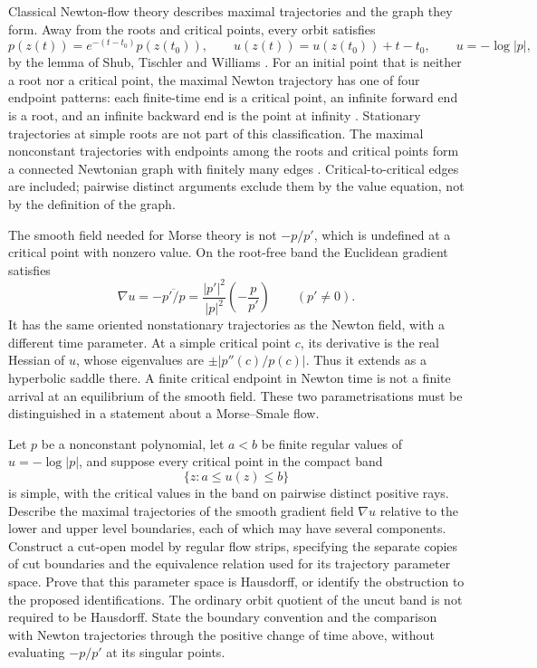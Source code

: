 \documentclass[11pt]{article}
\begin{document}
Classical Newton-flow theory describes maximal trajectories and the graph
they form. Away from the roots and critical points, every orbit satisfies
\[
 p(z(t))=e^{-(t-t_0)}p(z(t_0)),\qquad
 u(z(t))=u(z(t_0))+t-t_0,\qquad u=-\log|p|,
\]
by the lemma of Shub, Tischler and Williams
\cite[Lemma~2.1]{kozen-stefansson1997}. For an initial point that is neither
a root nor a critical point, the maximal Newton trajectory has one of
four endpoint patterns: each finite-time end is a critical point, an
infinite forward end is a root, and an infinite backward end is the
point at infinity \cite[Lemma~2.2]{kozen-stefansson1997}. Stationary
trajectories at simple roots are not part of this classification. The
maximal nonconstant trajectories with endpoints among the roots and critical
points form a connected Newtonian graph with finitely many edges
\cite[Definition~2.1 and \S2]{kozen-stefansson1997}. Critical-to-critical
edges are included; pairwise distinct arguments exclude them by the value
equation, not by the definition of the graph.

The smooth field needed for Morse theory is not $-p/p'$, which is
undefined at a critical point with nonzero value. On the root-free band the
Euclidean gradient satisfies
\[
 \nabla u=-\overline{p'/p}
   =\frac{|p'|^2}{|p|^2}\left(-\frac{p}{p'}\right)
 \qquad(p'\ne0).
\]
It has the same oriented nonstationary trajectories as the Newton
field, with a different time parameter. At a simple critical point
$c$, its derivative is the real Hessian of $u$, whose eigenvalues are
$\pm|p''(c)/p(c)|$. Thus it extends as a hyperbolic saddle there.
A finite critical endpoint in Newton time is not a finite arrival at
an equilibrium of the smooth field. These two parametrisations must be
distinguished in a statement about a Morse--Smale flow.

\begin{problem}\label{prob:globalflow1041}
Let $p$ be a nonconstant polynomial, let $a<b$ be finite regular values
of $u=-\log|p|$, and suppose every critical point in the compact band
\[
 \{z:a\le u(z)\le b\}
\]
is simple, with the critical values in the band on pairwise distinct
positive rays. Describe the maximal trajectories of the smooth gradient
field $\nabla u$ relative to the lower and upper level boundaries,
each of which may have several components. Construct a cut-open model
by regular flow strips, specifying the separate copies of cut boundaries
and the equivalence relation used for its trajectory parameter space.
Prove that this parameter space is Hausdorff, or identify the obstruction
to the proposed identifications. The ordinary orbit quotient of the
uncut band is not required to be Hausdorff. State the boundary convention
and the comparison with Newton trajectories through the positive change
of time above, without evaluating $-p/p'$ at its singular points.
\end{problem}
\end{document}
